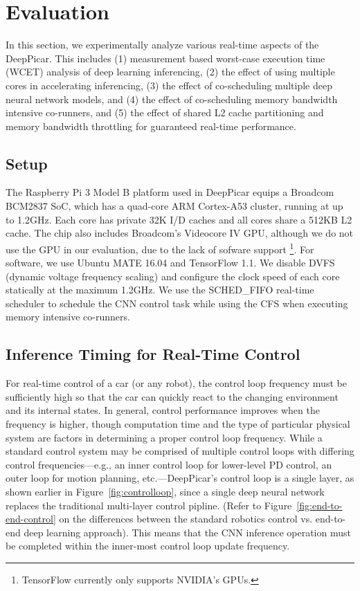 \section{Evaluation}\label{sec:evaluation}

In this section, we experimentally analyze various real-time aspects
of the DeepPicar. This includes
(1) measurement based worst-case execution time (WCET) analysis of
deep learning inferencing,
(2) the effect of using multiple cores in accelerating inferencing,
(3) the effect of co-scheduling multiple deep neural network models,
and 
(4) the effect of co-scheduling memory bandwidth intensive co-runners,
and
(5) the effect of shared L2 cache partitioning and memory bandwidth
throttling for guaranteed real-time performance.

\subsection{Setup}
The Raspberry Pi 3 Model B platform used in DeepPicar equips a Broadcom
BCM2837 SoC, which has a quad-core ARM Cortex-A53 cluster,
running at up to 1.2GHz. Each core has private 32K I/D caches
and all cores share a 512KB L2 cache.
The chip also includes Broadcom's Videocore IV GPU, although we do
not use the GPU in our evaluation, due to the lack of sofware support
\footnote{TensorFlow currently only supports NVIDIA's GPUs.}.
For software, we use Ubuntu MATE 16.04 and TensorFlow 1.1.
We disable DVFS (dynamic voltage frequency scaling) and
configure the clock speed of each core statically at the maximum 1.2GHz.
We use the SCHED\_FIFO real-time scheduler to schedule the CNN control
task while using the CFS when executing memory intensive co-runners.

\subsection{Inference Timing for Real-Time Control}
For real-time control of a car (or any robot), the control loop
frequency must be sufficiently high so that the car can quickly
react to the changing environment and its internal states. In general,
control performance improves when the frequency is higher, though
computation time and the type of particular physical system are
factors in determining a proper control loop frequency. While a standard
control system may be comprised of multiple control loops with
differing control frequencies---e.g., an inner control loop for lower-level
PD control, an outer loop for motion planning, etc.---DeepPicar's
control loop is a single layer, as shown earlier in
Figure~\ref{fig:controlloop}, since a single deep neural network
replaces the traditional multi-layer control pipline. (Refer to
Figure~\ref{fig:end-to-end-control} on the differences between the
standard robotics control vs. end-to-end deep learning approach).
This means that the CNN inference operation must be completed
within the inner-most control loop update frequency.

